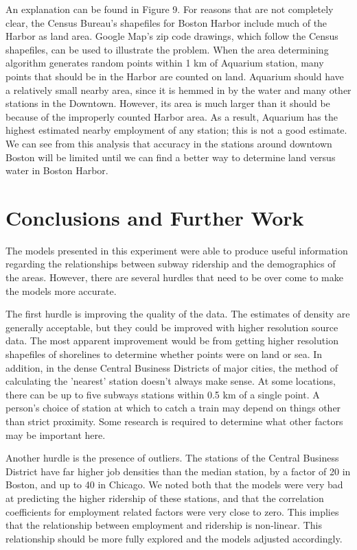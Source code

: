 \documentclass{article}
\begin{document}
An explanation can be found in Figure 9. For reasons that are not completely clear, the Census Bureau's shapefiles for Boston Harbor include much of the Harbor as land area. Google Map's zip code drawings, which follow the Census shapefiles, can be used to illustrate the problem. When the area determining algorithm generates random points within 1 km of Aquarium station, many points that should be in the Harbor are counted on land. Aquarium should have a relatively small nearby area, since it is hemmed in by the water and many other stations in the Downtown. However, its area is much larger than it should be because of the improperly counted Harbor area. As a result, Aquarium has the highest estimated nearby employment of any station; this is not a good estimate. We can see from this analysis that accuracy in the stations around downtown Boston will be limited until we can find a better way to determine land versus water in Boston Harbor.


\section{Conclusions and Further Work}

The models presented in this experiment were able to produce useful information regarding the relationships between subway ridership and the demographics of the areas. However, there are several hurdles that need to be over come to make the models more accurate.

The first hurdle is improving the quality of the data. The estimates of density are generally acceptable, but they could be improved with higher resolution source data. The most apparent improvement would be from getting higher resolution shapefiles of shorelines to determine whether points were on land or sea. In addition, in the dense Central Business Districts of major cities, the method of calculating the 'nearest' station doesn't always make sense. At some locations, there can be up to five subways stations within 0.5 km of a single point. A person's choice of station at which to catch a train may depend on things other than strict proximity. Some research is required to determine what other factors may be important here.

Another hurdle is the presence of outliers. The stations of the Central Business District have far higher job densities than the median station, by a factor of 20 in Boston, and up to 40 in Chicago. We noted both that the models were very bad at predicting the higher ridership of these stations, and that the correlation coefficients for employment related factors were very close to zero. This implies that the relationship between employment and ridership is non-linear. This relationship should be more fully explored and the models adjusted accordingly.
\end{document}
